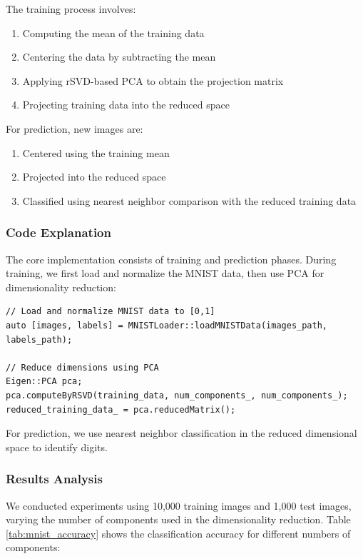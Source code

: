 \documentclass[11pt,a4paper]{article}
\begin{document}
The training process involves:
\begin{enumerate}
    \item Computing the mean of the training data
    \item Centering the data by subtracting the mean
    \item Applying rSVD-based PCA to obtain the projection matrix
    \item Projecting training data into the reduced space
\end{enumerate}

For prediction, new images are:
\begin{enumerate}
    \item Centered using the training mean
    \item Projected into the reduced space
    \item Classified using nearest neighbor comparison with the reduced training data
\end{enumerate}

\subsubsection{Code Explanation}
The core implementation consists of training and prediction phases. During training, we first load and normalize the MNIST data, then use PCA for dimensionality reduction:

\begin{verbatim}
// Load and normalize MNIST data to [0,1]
auto [images, labels] = MNISTLoader::loadMNISTData(images_path, labels_path);

// Reduce dimensions using PCA
Eigen::PCA pca;
pca.computeByRSVD(training_data, num_components_, num_components_);
reduced_training_data_ = pca.reducedMatrix();
\end{verbatim}

For prediction, we use nearest neighbor classification in the reduced dimensional space to identify digits.

\subsubsection{Results Analysis}
We conducted experiments using 10,000 training images and 1,000 test images, varying the number of components used in the dimensionality reduction. Table \ref{tab:mnist_accuracy} shows the classification accuracy for different numbers of components:
\end{document}
